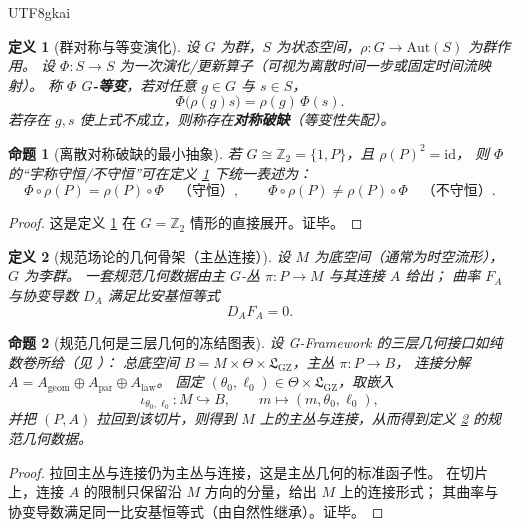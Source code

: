 \documentclass[12pt]{article}
\newtheorem{definition}{定义}[section]
\newtheorem{proposition}{命题}[section]
\begin{document}
\begin{CJK*}{UTF8}{gkai}
\begin{definition}[群对称与等变演化]\label{def:E-equivariance}
设 $G$ 为群，$S$ 为状态空间，$\rho:G\to \mathrm{Aut}(S)$ 为群作用。
设 $\Phi:S\to S$ 为一次演化/更新算子（可视为离散时间一步或固定时间流映射）。
称 $\Phi$ \textbf{$G$-等变}，若对任意 $g\in G$ 与 $s\in S$，
\[
  \Phi\big(\rho(g)s\big)=\rho(g)\,\Phi(s).
\]
若存在 $g,s$ 使上式不成立，则称存在\textbf{对称破缺}（等变性失配）。
\end{definition}

\begin{proposition}[离散对称破缺的最小抽象]\label{prop:E-parity-as-z2}
若 $G\cong \mathbb{Z}_2=\{1,P\}$，且 $\rho(P)^2=\mathrm{id}$，
则 $\Phi$ 的“宇称守恒/不守恒”可在定义 \ref{def:E-equivariance} 下统一表述为：
\[
  \Phi\circ \rho(P)=\rho(P)\circ \Phi
  \quad\text{（守恒）},\qquad
  \Phi\circ \rho(P)\neq \rho(P)\circ \Phi
  \quad\text{（不守恒）}.
\]
\end{proposition}

\begin{proof}
这是定义 \ref{def:E-equivariance} 在 $G=\mathbb{Z}_2$ 情形的直接展开。证毕。
\end{proof}

\begin{definition}[规范场论的几何骨架（主丛连接）]\label{def:E-gauge-bundle}
设 $M$ 为底空间（通常为时空流形），$G$ 为李群。
一套规范几何数据由主 $G$-丛 $\pi:P\to M$ 与其连接 $A$ 给出；
曲率 $F_A$ 与协变导数 $D_A$ 满足比安基恒等式
\[
  D_A F_A = 0.
\]
\end{definition}

\begin{proposition}[规范几何是三层几何的冻结图表]\label{prop:E-freeze-to-gauge}
设 G-Framework 的三层几何接口如纯数卷所给（见 \cite{GaoZheng2025GFramework}）：
总底空间 $B=M\times \Theta\times \mathfrak{L}_{\mathrm{GZ}}$，主丛 $\pi:P\to B$，
连接分解 $A=A_{\mathrm{geom}}\oplus A_{\mathrm{par}}\oplus A_{\mathrm{law}}$。
固定 $(\theta_0,\ell_0)\in \Theta\times \mathfrak{L}_{\mathrm{GZ}}$，取嵌入
\[
  \iota_{\theta_0,\ell_0}:M\hookrightarrow B,\qquad
  m\mapsto (m,\theta_0,\ell_0),
\]
并把 $(P,A)$ 拉回到该切片，则得到 $M$ 上的主丛与连接，从而得到定义 \ref{def:E-gauge-bundle} 的规范几何数据。
\end{proposition}

\begin{proof}
拉回主丛与连接仍为主丛与连接，这是主丛几何的标准函子性。
在切片上，连接 $A$ 的限制只保留沿 $M$ 方向的分量，给出 $M$ 上的连接形式；
其曲率与协变导数满足同一比安基恒等式（由自然性继承）。证毕。
\end{proof}


\end{CJK*}
\end{document}
